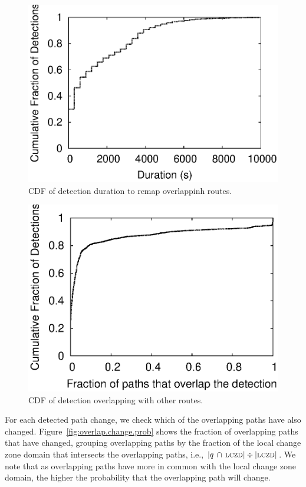 \begin{figure}
\begin{center}
\includegraphics[width=0.8\columnwidth]{figs/patching/durationdetection/durationdetection.eps}
\caption{CDF of detection duration to remap overlappinh routes. }
\label{fig:overlap.delay.cdf}
\end{center}
%
\end{figure}
%
\begin{figure}
\begin{center}
\includegraphics[width=0.8\columnwidth]{figs/patching/routesoverlapping/routesoverlapping.eps}
\caption{CDF of detection overlapping with other routes.}
\label{fig:join.acc}
\end{center}
%
\end{figure}


For each detected path change, we check which of the overlapping
paths have also changed.  Figure~\ref{fig:overlap.change.prob} shows
the fraction of overlapping paths that have changed, grouping
overlapping paths by the fraction of the local change zone domain
that intersects the overlapping paths, i.e.,
$|q\,\cap\,\mathrm{\textsc{lczd}}|\div|\mathrm{\textsc{lczd}}|$.  We note that as overlapping paths
have more in common with the local change zone domain, the higher
the probability that the overlapping path will change.  

